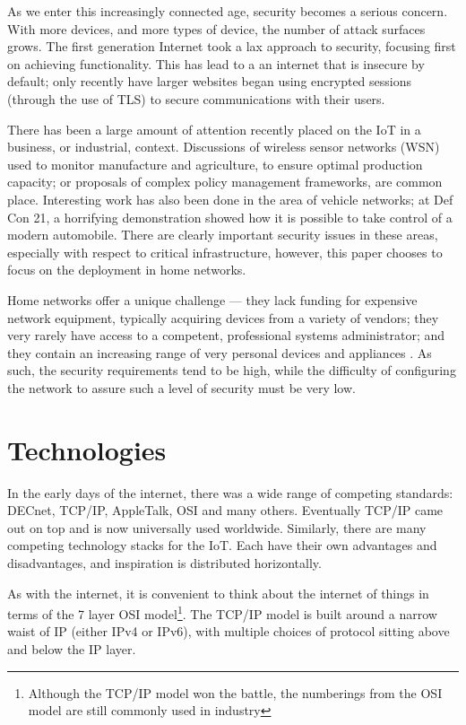\documentclass[journal]{IEEEtran}
\begin{document}
As we enter this increasingly connected age, security becomes a serious
concern. With more devices, and more types of device, the number of attack
surfaces grows. The first generation Internet took a lax approach to security,
focusing first on achieving functionality. This has lead to a an internet that
is insecure by default; only recently have larger websites began using
encrypted sessions (through the use of TLS) to secure communications with their
users. 

There has been a large amount of attention recently placed on the IoT in a
business, or industrial, context. Discussions of wireless sensor networks (WSN)
used to monitor manufacture and agriculture, to ensure optimal production
capacity; or proposals of complex policy management frameworks, are common
place. Interesting work has also been done in the area of vehicle networks; at
Def Con 21, a horrifying demonstration showed how it is possible to take
control of a modern automobile. There are clearly important security issues in
these areas, especially with respect to critical infrastructure, however, this
paper chooses to focus on the deployment in home networks. 

Home networks offer a unique challenge — they lack funding for expensive
network equipment, typically acquiring devices from a variety of vendors; they
very rarely have access to a competent, professional systems administrator; and
they contain an increasing range of very personal devices and appliances
\cite{ACM_ModHome}. As such, the security requirements tend to be high, while
the difficulty of configuring the network to assure such a level of security
must be very low. 


\section{Technologies}
In the early days of the internet, there was a wide range of competing
standards: DECnet, TCP/IP, AppleTalk, OSI and many others.  Eventually TCP/IP
came out on top and is now universally used worldwide. Similarly, there are
many competing technology stacks for the IoT. Each have their own advantages
and disadvantages, and inspiration is distributed horizontally. 

As with the internet, it is convenient to think about the internet of things in
terms of the 7 layer OSI model\footnote{Although the TCP/IP model won the
battle, the numberings from the OSI model are still commonly used in industry}.
The TCP/IP model is built around a narrow waist of IP (either IPv4 or IPv6),
with multiple choices of protocol sitting above and below the IP layer. 
\end{document}
